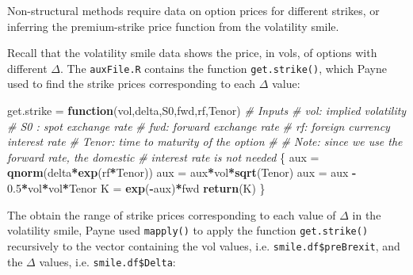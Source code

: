 \documentclass[]{book}
\newenvironment{Shaded}{\begin{snugshade}}{\end{snugshade}}
\newcommand{\KeywordTok}[1]{\textcolor[rgb]{0.13,0.29,0.53}{\textbf{#1}}}
\newcommand{\FloatTok}[1]{\textcolor[rgb]{0.00,0.00,0.81}{#1}}
\newcommand{\StringTok}[1]{\textcolor[rgb]{0.31,0.60,0.02}{#1}}
\newcommand{\CommentTok}[1]{\textcolor[rgb]{0.56,0.35,0.01}{\textit{#1}}}
\newcommand{\ControlFlowTok}[1]{\textcolor[rgb]{0.13,0.29,0.53}{\textbf{#1}}}
\newcommand{\OperatorTok}[1]{\textcolor[rgb]{0.81,0.36,0.00}{\textbf{#1}}}
\newcommand{\NormalTok}[1]{#1}
\theoremstyle{definition}
\theoremstyle{definition}
\theoremstyle{definition}
\theoremstyle{remark}
\begin{document}
Non-structural methods require data on option prices for different
strikes, or inferring the premium-strike price function from the
volatility smile.

Recall that the volatility smile data shows the price, in vols, of
options with different \(\Delta\). The \texttt{auxFile.R} contains the
function \texttt{get.strike()}, which Payne used to find the strike
prices corresponding to each \(\Delta\) value:

\begin{Shaded}
\begin{Highlighting}[]
\NormalTok{get.strike =}\StringTok{ }\ControlFlowTok{function}\NormalTok{(vol,delta,S0,fwd,rf,Tenor)}
\CommentTok{# Inputs}
\CommentTok{#   vol:     implied volatility}
\CommentTok{#   S0 :     spot exchange rate}
\CommentTok{#   fwd:     forward exchange rate}
\CommentTok{#   rf:      foreign currency interest rate}
\CommentTok{#   Tenor:   time to maturity of the option}
\CommentTok{#}
\CommentTok{# Note: since we use the forward rate, the domestic}
\CommentTok{#       interest rate is not needed}
\NormalTok{\{}
\NormalTok{  aux =}\StringTok{ }\KeywordTok{qnorm}\NormalTok{(delta}\OperatorTok{*}\KeywordTok{exp}\NormalTok{(rf}\OperatorTok{*}\NormalTok{Tenor))}
\NormalTok{  aux =}\StringTok{ }\NormalTok{aux}\OperatorTok{*}\NormalTok{vol}\OperatorTok{*}\KeywordTok{sqrt}\NormalTok{(Tenor)}
\NormalTok{  aux =}\StringTok{ }\NormalTok{aux }\OperatorTok{-}\StringTok{ }\FloatTok{0.5}\OperatorTok{*}\NormalTok{vol}\OperatorTok{*}\NormalTok{vol}\OperatorTok{*}\NormalTok{Tenor}
\NormalTok{  K =}\StringTok{ }\KeywordTok{exp}\NormalTok{(}\OperatorTok{-}\NormalTok{aux)}\OperatorTok{*}\NormalTok{fwd}
  \KeywordTok{return}\NormalTok{(K)}
\NormalTok{\}}
\end{Highlighting}
\end{Shaded}

The obtain the range of strike prices corresponding to each value of
\(\Delta\) in the volatility smile, Payne used \texttt{mapply()} to
apply the function \texttt{get.strike()} recursively to the vector
containing the vol values, i.e. \texttt{smile.df\$preBrexit}, and the
\(\Delta\) values, i.e. \texttt{smile.df\$Delta}:
\end{document}
